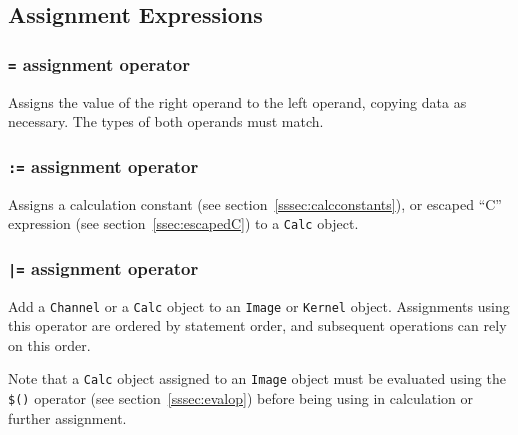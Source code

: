 \subsection{Assignment Expressions}
\label{ssec:assignment}

\subsubsection{\texttt{=} assignment operator}
\label{sssec:equalop}
Assigns the value of the right operand to the left operand, copying data as necessary.
The types of both operands must match.

\subsubsection{\texttt{:=} assignment operator}
\label{sssec:colonequalop}
Assigns a calculation constant (see section~\ref{sssec:calcconstants}), or
escaped ``C'' expression (see section~\ref{ssec:escapedC}) to a \texttt{Calc}
object.

\subsubsection{\texttt{|=} assignment operator}
\label{sssec:barequalop}
Add a \texttt{Channel} or a \texttt{Calc} object to an \texttt{Image} or
\texttt{Kernel} object. Assignments using this operator are ordered by statement
order, and subsequent operations can rely on this order.

Note that a \texttt{Calc} object assigned to an \texttt{Image} object must be
evaluated using the \texttt{\$()} operator (see section~\ref{sssec:evalop}) before
being using in calculation or further assignment.


